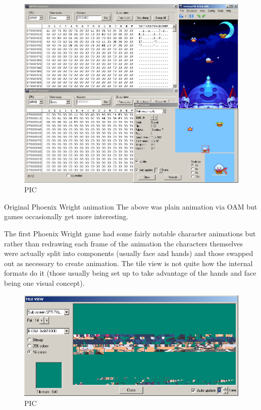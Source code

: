 \documentclass[
]{book}
\begin{document}
\begin{figure}
\centering
\includegraphics{images/50_home_fast6191_romhackingguide_unrenamed_file___ginal_borders_romhackingguideOAManimation_3.png}
\caption{PIC}
\end{figure}

Original Phoenix Wright animation The above was plain animation via OAM but games occasionally get more interesting.

The first Phoenix Wright game had some fairly notable character animations but rather than redrawing each frame of the animation the characters themselves were actually split into components (usually face and hands) and those swapped out as necessary to create animation. The tile view is not quite how the internal formats do it (those usually being set up to take advantage of the hands and face being one visual concept).

\begin{figure}
\centering
\includegraphics{images/51_home_fast6191_romhackingguide_unrenamed_file___nal_borders_romhackingguideOAManimation_2_1.png}
\caption{PIC}
\end{figure}
\end{document}
